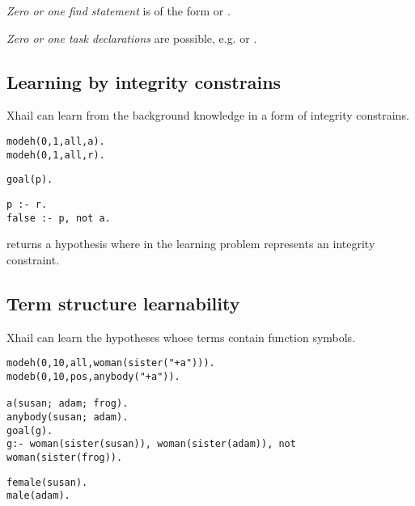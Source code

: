 \emph{Zero or one find statement} is of the form  or .

\emph{Zero or one task declarations} are possible, e.g.  or .

\subsection{Learning by integrity constrains}
Xhail can learn from the background knowledge in a form of integrity constrains.

\begin{minipage}[t]{.30\textwidth}
\begin{lstlisting}
modeh(0,1,all,a).
modeh(0,1,all,r).
\end{lstlisting}
\end{minipage}
\begin{minipage}[t]{.20\textwidth}
\begin{lstlisting}
goal(p).
\end{lstlisting}
\end{minipage}
\begin{minipage}[t]{.20\textwidth}
\begin{lstlisting}
p :- r.
false :- p, not a.
\end{lstlisting}
\end{minipage}

returns a hypothesis  where in the learning problem
 represents an integrity constraint.

\subsection{Term structure learnability}
Xhail can learn the hypotheses whose terms contain function symbols.

\begin{minipage}[t]{.60\textwidth}
\begin{lstlisting}
modeh(0,10,all,woman(sister("+a"))).
modeb(0,10,pos,anybody("+a")).

a(susan; adam; frog).
anybody(susan; adam).
goal(g).
g:- woman(sister(susan)), woman(sister(adam)), not woman(sister(frog)).
\end{lstlisting}
\end{minipage}
\begin{minipage}[t]{.20\textwidth}
\begin{lstlisting}
female(susan).
male(adam).
\end{lstlisting}
\end{minipage}

